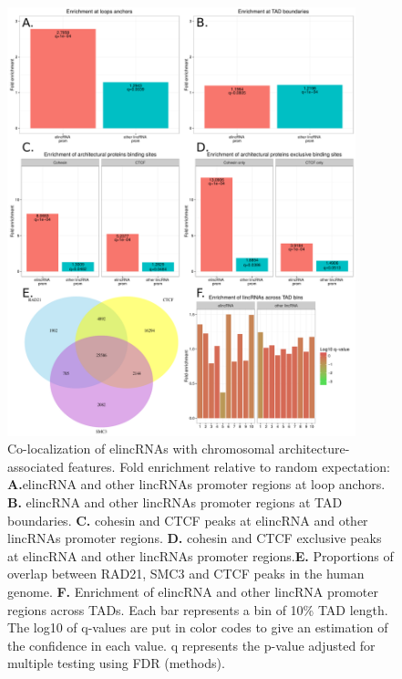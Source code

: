 \documentclass[11pt,a4paper]{report}
\begin{document}
\begin{figure}[ht]
	\includegraphics[width=0.9\textwidth]{Figures/2_Enrichment.pdf}
	\caption{Co-localization of elincRNAs with chromosomal architecture-associated features. Fold enrichment relative to random expectation: \textbf{A.}elincRNA and other lincRNAs promoter regions at loop anchors. \textbf{B.} elincRNA and other lincRNAs promoter regions at TAD boundaries. \textbf{C.} cohesin and CTCF peaks at elincRNA and other lincRNAs promoter regions. \textbf{D.} cohesin and CTCF exclusive peaks at elincRNA and other lincRNAs promoter regions.\textbf{E.} Proportions of overlap between RAD21, SMC3 and CTCF peaks in the human genome. \textbf{F.} Enrichment of elincRNA and other lincRNA promoter regions across TADs. Each bar represents a bin of 10\% TAD length. The log10 of q-values are put in color codes to give an estimation of the confidence in each value. q represents the p-value adjusted for multiple testing using FDR (methods).}
	\label{enrich_elinc}
\end{figure}
\end{document}
